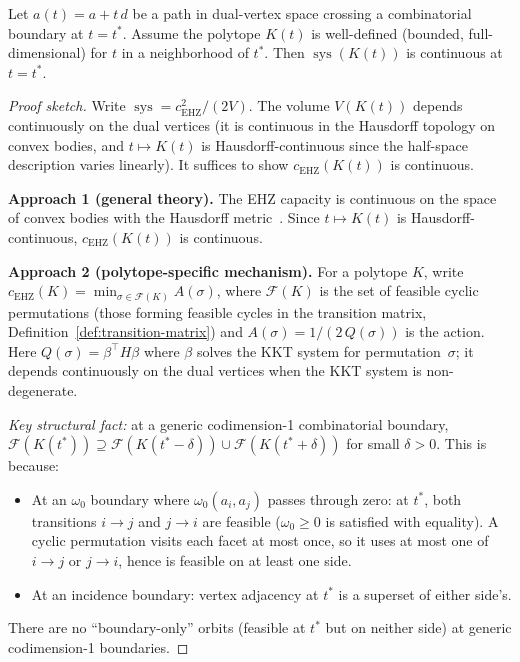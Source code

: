 \begin{proposition}%
\label{prop:sys-continuous}
Let $a(t) = a + t \, d$ be a path in dual-vertex space crossing a combinatorial
boundary at $t = t^*$. Assume the polytope $K(t)$ is well-defined (bounded, full-dimensional)
for $t$ in a neighborhood of $t^*$. Then
$\operatorname{sys}(K(t))$ is continuous at $t = t^*$.
\end{proposition}
\begin{proof}[Proof sketch]
Write $\operatorname{sys} = c_{\mathrm{EHZ}}^2 / (2V)$.
The volume $V(K(t))$ depends continuously on the dual vertices (it is continuous
in the Hausdorff topology on convex bodies, and $t \mapsto K(t)$ is Hausdorff-continuous
since the half-space description varies linearly).
It suffices to show $c_{\mathrm{EHZ}}(K(t))$ is continuous.

\textbf{Approach 1 (general theory).}
The EHZ capacity is continuous on the space of convex bodies with the Hausdorff
metric~\cite{HoferZehnder1994}. Since $t \mapsto K(t)$ is Hausdorff-continuous,
$c_{\mathrm{EHZ}}(K(t))$ is continuous.

\textbf{Approach 2 (polytope-specific mechanism).}
For a polytope $K$, write $c_{\mathrm{EHZ}}(K) = \min_{\sigma \in \mathcal{F}(K)} A(\sigma)$,
where $\mathcal{F}(K)$ is the set of feasible cyclic permutations
(those forming feasible cycles in the transition matrix,
Definition~\ref{def:transition-matrix})
and $A(\sigma) = 1/(2\,Q(\sigma))$ is the action.
Here $Q(\sigma) = \beta^\top H \beta$ where $\beta$ solves the KKT system
for permutation~$\sigma$; it depends continuously on the dual vertices
when the KKT system is non-degenerate.

\emph{Key structural fact:} at a generic codimension-1 combinatorial boundary,
$\mathcal{F}(K(t^*)) \supseteq \mathcal{F}(K(t^* - \delta)) \cup \mathcal{F}(K(t^* + \delta))$
for small $\delta > 0$.
This is because:
\begin{itemize}
  \item At an $\omega_0$ boundary where $\omega_0(a_i, a_j)$ passes through zero:
    at $t^*$, both transitions $i \to j$ and $j \to i$ are feasible ($\omega_0 \ge 0$
    is satisfied with equality). A cyclic permutation visits each facet at most once,
    so it uses at most one of $i \to j$ or $j \to i$, hence is feasible on at least
    one side.
  \item At an incidence boundary: vertex adjacency at $t^*$ is a superset of either side's.
\end{itemize}
There are no ``boundary-only'' orbits (feasible at $t^*$ but on neither side)
at generic codimension-1 boundaries.


\end{proof}
